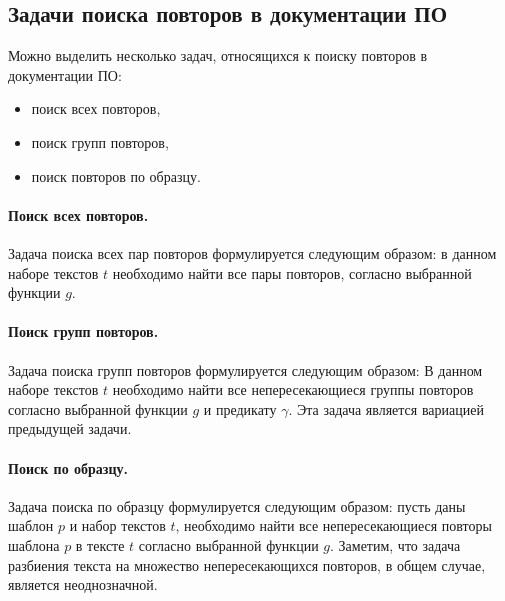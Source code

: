 \subsection{Задачи поиска повторов в документации ПО}

Можно выделить несколько задач, относящихся к поиску повторов в документации ПО:
\begin{itemize}
\item поиск всех {повторов},
\item поиск {групп повторов},
\item поиск {повторов} по образцу.
\end{itemize}

\paragraph{Поиск всех повторов.}
Задача поиска всех пар {повторов} формулируется следующим образом: в данном наборе текстов $t$ необходимо найти все пары повторов, согласно выбранной функции $g$.

\paragraph{Поиск групп повторов.}
Задача поиска групп повторов формулируется следующим образом:
В данном наборе текстов $t$ необходимо найти все непересекающиеся группы повторов согласно выбранной функции $g$ и предикату $\gamma$.
Эта задача является вариацией предыдущей задачи.

\paragraph{Поиск по образцу.}
Задача поиска по образцу формулируется следующим образом:
пусть даны шаблон $p$ и набор текстов $t$, необходимо найти все непересекающиеся повторы шаблона $p$ в тексте $t$ согласно выбранной функции  $g$.
Заметим, что задача разбиения текста на множество непересекающихся повторов, в общем случае, является неоднозначной.



